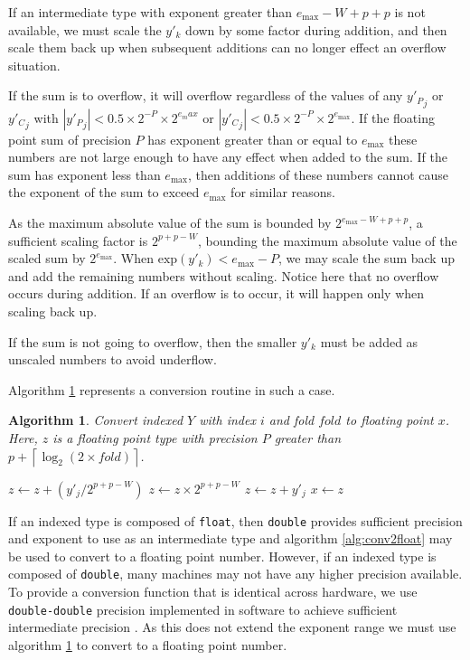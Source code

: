 \documentclass[12pt]{article}
\providecommand{\ceil}[1]{\left \lceil #1 \right \rceil }
\providecommand{\exp}{\ensuremath{\text{exp}}}
\providecommand{\max}{\ensuremath{\text{max}}}
\theoremstyle{plain}
\newtheorem{alg}{Algorithm}[section]
\begin{document}
    If an intermediate type with exponent greater than $e_{\max} - W + p + p$ is not available, we must scale the $y'_k$ down by some factor during addition, and then scale them back up when subsequent additions can no longer effect an overflow situation.

    If the sum is to overflow, it will overflow regardless of the values of any ${y'_P}_j$ or ${y'_C}_j$ with $|{y'_P}_j| < 0.5 \times 2^{-P} \times 2^{e_max}$ or $|{y'_C}_j| < 0.5 \times 2^{-P} \times 2^{e_{\max}}$. If the floating point sum of precision $P$ has exponent greater than or equal to $e_{\max}$ these numbers are not large enough to have any effect when added to the sum. If the sum has exponent less than $e_{\max}$, then additions of these numbers cannot cause the exponent of the sum to exceed $e_{\max}$ for similar reasons.

    As the maximum absolute value of the sum is bounded by $2^{e_{\max} - W + p + p}$, a sufficient scaling factor is $2^{p + p - W}$, bounding the maximum absolute value of the scaled sum by $2^{e_{\max}}$. When $\exp(y'_k) < e_{\max} - P$, we may scale the sum back up and add the remaining numbers without scaling. Notice here that no overflow occurs during addition. If an overflow is to occur, it will happen only when scaling back up.

    If the sum is not going to overflow, then the smaller $y'_k$ must be added as unscaled numbers to avoid underflow.

    Algorithm \ref{alg:conv2floatoverflow} represents a conversion routine in such a case.

    \begin{alg}
      Convert indexed $Y$ with index $i$ and fold $fold$ to floating point $x$. Here, $z$ is a floating point type with precision $P$ greater than $p + \ceil{\log_2(2 \times fold)}$.
      \begin{algorithmic}
          \While{$j \leq 2 \times fold$ and $\exp(y'_j) \geq e_{\max} - P$}
            \State $z \gets z + (y'_j / 2^{p + p - W})$
          \EndWhile
          \State $z \gets z \times 2^{p + p - W}$
            \State $z \gets z + y'_j$
          \EndWhile
          \State $x \gets z$
        \EndFunction
      \end{algorithmic}
      \label{alg:conv2floatoverflow}
    \end{alg}

    If an indexed type is composed of \verb|float|, then \verb|double| provides sufficient precision and exponent to use as an intermediate type and algorithm \ref{alg:conv2float} may be used to convert to a floating point number.
    However, if an indexed type is composed of \verb|double|, many machines may not have any higher precision available. To provide a conversion function that is identical across hardware, we use \verb|double-double| precision implemented in software to achieve sufficient intermediate precision \cite{doubledouble}. As this does not extend the exponent range we must use algorithm \ref{alg:conv2floatoverflow} to convert to a floating point number.
\end{document}
